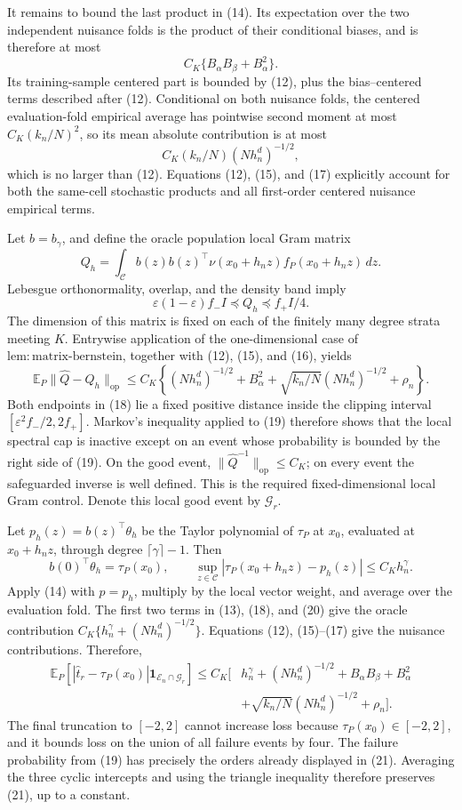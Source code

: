 It remains to bound the last product in (14).  Its expectation over the two
independent nuisance folds is the product of their conditional biases, and is
therefore at most
\[
C_K\{B_\alpha B_\beta+B_\alpha^2\}.
\tag{16}
\]
Its training-sample centered part is bounded by (12), plus the bias--centered
terms described after (12).  Conditional on both nuisance folds, the centered
evaluation-fold empirical average has pointwise second moment at most
\(C_K(k_n/N)^2\), so its mean absolute contribution is at most
\[
C_K(k_n/N)(Nh_n^d)^{-1/2},
\tag{17}
\]
which is no larger than (12).  Equations (12), (15), and (17) explicitly
account for both the same-cell stochastic products and all first-order
centered nuisance empirical terms.

Let \(b=b_\gamma\), and define the oracle population local Gram matrix
\[
Q_h=\int_{\mathcal C}b(z)b(z)^\top
\nu(x_0+h_nz)f_P(x_0+h_nz)\,dz.
\]
Lebesgue orthonormality, overlap, and the density band imply
\[
\varepsilon(1-\varepsilon)f_-I
\preceq Q_h\preceq f_+I/4.
\tag{18}
\]
The dimension of this matrix is fixed on each of the finitely many degree
strata meeting \(K\).  Entrywise application of the one-dimensional case of
\(\mathrm{lem:matrix\mbox{-}bernstein}\), together with (12), (15), and
(16), yields
\[
\mathbb E_P\|\widehat Q-Q_h\|_{\mathrm{op}}
\le C_K\left\{(Nh_n^d)^{-1/2}+B_\alpha^2
+\sqrt{k_n/N}(Nh_n^d)^{-1/2}+\rho_n\right\}.
\tag{19}
\]
Both endpoints in (18) lie a fixed positive distance inside the clipping
interval \([\varepsilon^2f_-/2,2f_+]\).  Markov's inequality applied to
(19) therefore shows that the local spectral cap is inactive except on an
event whose probability is bounded by the right side of (19).  On the good
event, \(\|\widehat Q^{-1}\|_{\mathrm{op}}\le C_K\); on every event the
safeguarded inverse is well defined.  This is the required fixed-dimensional
local Gram control.  Denote this local good event by \(\mathcal G_r\).

Let \(p_h(z)=b(z)^\top\theta_h\) be the Taylor polynomial of \(\tau_P\) at
\(x_0\), evaluated at \(x_0+h_nz\), through degree
\(\lceil\gamma\rceil-1\).  Then
\[
b(0)^\top\theta_h=\tau_P(x_0),
\qquad
\sup_{z\in\mathcal C}|\tau_P(x_0+h_nz)-p_h(z)|
\le C_Kh_n^\gamma.
\tag{20}
\]
Apply (14) with \(p=p_h\), multiply by the local vector weight, and average
over the evaluation fold.  The first two terms in (13), (18), and (20) give
the oracle contribution
\(C_K\{h_n^\gamma+(Nh_n^d)^{-1/2}\}\).  Equations (12), (15)--(17) give
the nuisance contributions.  Therefore,
\[
\begin{aligned}
\mathbb E_P\!\left[
|\widehat t_r-\tau_P(x_0)|
\mathbf 1_{\mathcal E_n\cap\mathcal G_r}\right]
\le C_K\big[&h_n^\gamma+(Nh_n^d)^{-1/2}
+B_\alpha B_\beta+B_\alpha^2\\
&+\sqrt{k_n/N}(Nh_n^d)^{-1/2}+\rho_n\big].
\end{aligned}
\tag{21}
\]
The final truncation to \([-2,2]\) cannot increase loss because
\(\tau_P(x_0)\in[-2,2]\), and it bounds loss on the union of all failure
events by four.  The failure probability from (19) has precisely the orders
already displayed in (21).  Averaging the three cyclic intercepts and using
the triangle inequality therefore preserves (21), up to a constant.

